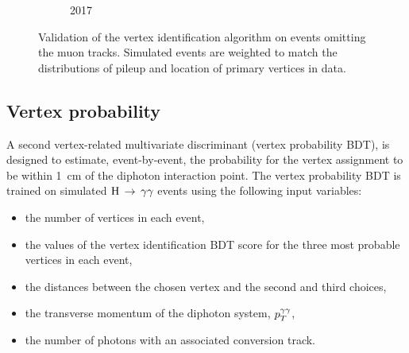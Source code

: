 \begin{figure}[h!]
\begin{subfigure}{0.49\textwidth}
    \caption{2017}
    \label{fig:obj_vtxid_2016}
  \end{subfigure}
  \caption{
  Validation of the \Hgg vertex identification algorithm on \Zmumu events
  omitting the muon tracks. Simulated events are weighted to match the distributions of pileup
  and location of primary vertices in data.
  }
  \label{fig:obj_vtxid}
\end{figure}

\subsection{Vertex probability}

A second vertex-related multivariate discriminant (vertex probability BDT),
is designed to estimate, event-by-event, the probability for the vertex
assignment to be within \SI{1}{cm} of the diphoton interaction point.
The vertex probability BDT is trained on simulated $\mathrm{H}\,\rightarrow\,\gamma\gamma$ events using
the following input variables:
\begin{itemize}
        \item the number of vertices in each event,
        \item the values of the vertex identification BDT score for
                the three most probable vertices in each event,
        \item the distances between the chosen vertex and the second and
                third choices,
        \item the transverse momentum of the diphoton system, $p_T^{\gamma\gamma}$,
        \item the number of photons with an associated conversion track.
\end{itemize}

